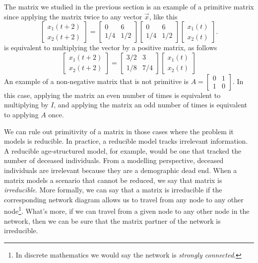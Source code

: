 \documentclass[../book.tex]{subfiles}
\begin{document}
The matrix we studied in the previous section is an example of a primitive matrix since applying the matrix twice to any vector \(\vec{x}\), like this
\begin{equation}\label{eq:eig-45}
\begin{bmatrix}
  x_1(t+2) \\ x_2(t+2)
\end{bmatrix}
=
\begin{bmatrix}
  0 & 6 \\
  1/4 & 1/2
\end{bmatrix}
\begin{bmatrix}
  0 & 6 \\
  1/4 & 1/2
\end{bmatrix}
\begin{bmatrix}
  x_1(t) \\ x_2(t)
\end{bmatrix}.
\end{equation}
is equivalent to multiplying the vector by a positive matrix, as follows
\begin{equation}\label{eq:eig-46}
\begin{bmatrix}
  x_1(t+2) \\ x_2(t+2)
\end{bmatrix}
=
\begin{bmatrix}
  3/2 & 3 \\
  1/8 & 7/4
\end{bmatrix}
\begin{bmatrix}
  x_1(t) \\ x_2(t)
\end{bmatrix}
\end{equation}
An example of a non-negative matrix that is not primitive is \(A = \begin{bmatrix} 0 & 1 \\ 1 & 0\end{bmatrix}\). In this case, applying the matrix an even number of times is equivalent to multiplying by \(I\), and applying the matrix an odd number of times is equivalent to applying \(A\) once.

We can rule out primitivity of a matrix in those cases where the problem it models is reducible. In practice, a reducible model tracks irrelevant information. A reducible age-structured model, for example, would be one that tracked the number of deceased individuals. From a modelling perspective, deceased individuals are irrelevant because they are a demographic dead end. When a matrix models a scenario that cannot be reduced, we say that matrix is \emph{irreducible}.
More formally, we can say that a matrix is irreducible if the corresponding network diagram allows us to travel from any node to any other node\footnote{In discrete mathematics we would say the network is \emph{strongly connected}.}. What's more, if we can travel from a given node to any other node in the network, then we can be sure that the matrix partner of the network is irreducible.
\end{document}
